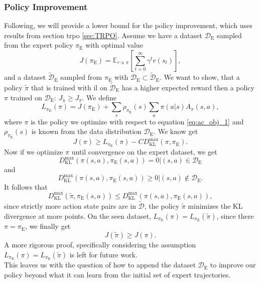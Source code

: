 \subsubsection{Policy Improvement}
Following, we will provide a lower bound for the policy improvement, which uses results from section \ac{trpo} \ref{sec:TRPO}. 
Assume we have a dataset $\mathcal{D}_{\text{E}}$ sampled from the expert policy $\pi_{\text{E}}$ with optimal value 
$$J(\pi_{\text{E}}) =\mathbb{E}_{\tau \propto \pi}\left[\sum_{t=0}^{\infty}  \gamma^t r(s_t) \right],$$
and a dataset $\tilde{\mathcal{D}}_{\text{E}}$ sampled from $\pi_{\text{E}}$ with $\mathcal{D}_{\text{E}} \subset \tilde{\mathcal{D}}_{\text{E}}$. 
We want to show, that a policy $\tilde{\pi}$ that is trained with \ac{il} on $\tilde{\mathcal{D}}_{\text{E}}$ has 
a higher expected reward then a policy $\pi$ trained on $\mathcal{D}_{\text{E}}$: $J_{\tilde{\pi}} \geq J_{\pi}$.
We define 
$$L_{\pi_{\text{E}}}(\pi) = J(\pi_{\text{E}}) + \sum_s \rho_{\pi_{\text{E}}}(s) \sum_a \pi(a|s) A_{\pi}(s,a),$$
where $\pi$ is the policy we optimize with respect to equation \ref{eq:ac_obj_1} and $\rho_{\pi_{\text{E}}}(s)$ is known from 
the data distribution $\mathcal{D}_{\text{E}}$. We know get 
$$J({\pi}) \geq L_{\pi_{\text{E}}}({\pi}) - C D^{\max}_{\operatorname{KL}} (\pi,\pi_{\text{E}}).$$
Now if we optimize $\pi$ until convergence on the expert dataset, we get 
$$D^{\max}_{\operatorname{KL}}(\pi(s,a),\pi_{\text{E}}(s,a)) = 0 |(s,a) \in \mathcal{D}_{\text{E}}$$
and 
$$D^{\max}_{\operatorname{KL}}(\pi(s,a),\pi_{\text{E}}(s,a)) \geq 0 |(s,a) \notin \mathcal{D}_{\text{E}}.$$
It follows that 
$$D^{\max}_{\operatorname{KL}}(\tilde{\pi},\pi_{\text{E}}(s,a)) \leq D^{\max}_{\operatorname{KL}}(\pi(s,a),\pi_{\text{E}}(s,a)),$$
since strictly more action state pairs are in $\tilde{\mathcal{D}}$, the policy $\tilde{\pi}$ minimizes the KL divergence at more points.
On the seen dataset, $L_{\pi_{\text{E}}}({\pi}) = L_{\pi_{\text{E}}}({\tilde{\pi}})$, since there $\pi = \pi_{\text{E}}$, we finally get 
\begin{equation}
    J(\tilde{\pi}) \geq J({\pi}).
\end{equation}
A more rigorous proof, specifically considering the assumption $L_{\pi_{\text{E}}}({\pi}) = L_{\pi_{\text{E}}}({\tilde{\pi}})$ is left for future work.\\

This leaves us with the question of how to append the dataset $\mathcal{D}_{\text{E}}$ to improve our policy beyond what it can learn from the 
initial set of expert trajectories.\\

